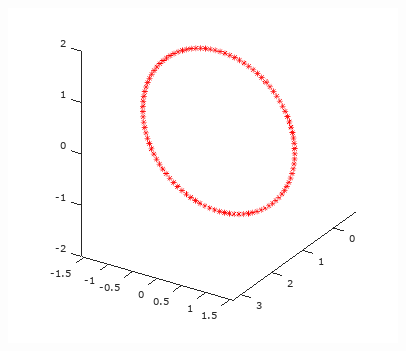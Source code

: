 \documentclass[12pt]{article}
\begin{document}
\begin{minipage}{\textwidth}
\begin{figure}[H]
	    \includegraphics[scale=0.5]{primer6_4} 
	\end{figure}
	\end{minipage}
	
\end{document}
